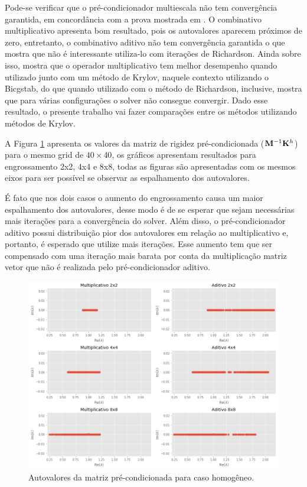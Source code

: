 Pode-se verificar que o pré-condicionador multiescala não tem convergência garantida, em concordância com a prova mostrada em \cite{zhouiterativo}. O combinativo multiplicativo apresenta bom resultado, pois os autovalores aparecem próximos de zero, entretanto, o combinativo aditivo não tem convergência garantida o que mostra que não é interessante utiliza-lo com iterações de Richardson. Ainda sobre isso, \cite{casteletto} mostra que o operador multiplicativo tem melhor desempenho quando utilizado junto com um método de Krylov, naquele contexto utilizando o Bicgstab, do que quando utilizado com o método de Richardson, inclusive, mostra que para várias configurações o solver não consegue convergir. Dado esse resultado, o presente trabalho vai fazer comparações entre os métodos utilizando métodos de Krylov. 

A Figura \ref{fig:autovaloresMatrizPrecon} apresenta os valores da matriz de rigidez pré-condicionada ($\mathbf{M}^{-1} \mathbf{K}^h$) para o mesmo grid de $40 \times 40$, os gráficos apresentam  resultados para engrossamento 2x2, 4x4 e 8x8, todas as figuras são apresentadas com os mesmos eixos para ser possível se observar as espalhamento dos autovalores.

É fato que nos dois casos o aumento do engrossamento causa um maior espalhamento dos autovalores, desse modo é de se esperar que sejam necessárias mais iterações para a convergência do solver. Além disso, o pré-condicionador aditivo possui distribuição pior dos autovalores em relação ao multiplicativo e, portanto, é esperado que utilize mais iterações. Esse aumento tem que ser compensado com uma iteração mais barata por conta da multiplicação matriz vetor que não é realizada pelo pré-condicionador aditivo.


\begin{figure}[!htbp]
\centering
\includegraphics[width=\textwidth]{chap06/figs/AutovaloresMatPrecondicionada.png}
\caption{Autovalores da matriz pré-condicionada para caso homogêneo.}
\label{fig:autovaloresMatrizPrecon}
\end{figure}

